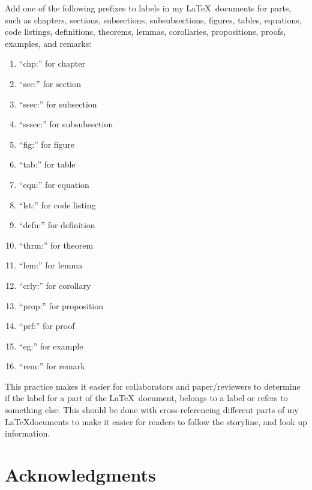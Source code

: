 \documentclass[letter,12pt]{article}
\begin{document}
Add one of the following prefixes to labels in my \LaTeX\ documents for parts, such as chapters, sections, subsections, subsubsections, figures, tables, equations, code listings, definitions, theorems, lemmas, corollaries, propositions, proofs, examples, and remarks: \vspace{-0.3cm}
\begin{enumerate} \itemsep -4pt
\item ``chp:'' for chapter
\item ``sec:'' for section
\item ``ssec:'' for subsection
\item ``sssec:'' for subsubsection
\item ``fig:'' for figure
\item ``tab:'' for table
\item ``eqn:'' for equation
\item ``lst:'' for code listing
\item ``defn:'' for definition
\item ``thrm:'' for theorem
\item ``lem:'' for lemma
\item ``crly:'' for corollary
\item ``prop:'' for proposition
\item ``prf:'' for proof
\item ``eg:'' for example
\item ``rem:'' for remark
\end{enumerate}


This practice makes it easier for collaborators and paper/reviewers to determine if the label for a part of the \LaTeX\ document, belongs to a label or refers to something else. This should be done with cross-referencing different parts of my \LaTeX documents to make it easier for readers to follow the storyline, and look up information.














\section*{Acknowledgments}
\label{sec:Acknowledgments}
\end{document}
